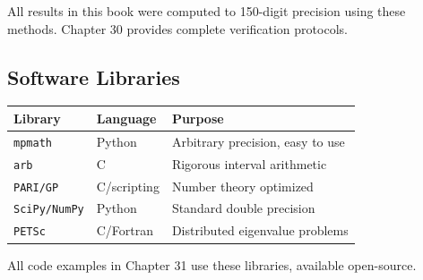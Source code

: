 All results in this book were computed to 150-digit precision using these methods. Chapter 30 provides complete verification protocols.

\subsection{Software Libraries}

\begin{center}
\begin{tabular}{|l|l|l|}
\hline
\textbf{Library} & \textbf{Language} & \textbf{Purpose} \\
\hline
\texttt{mpmath} & Python & Arbitrary precision, easy to use \\
\texttt{arb} & C & Rigorous interval arithmetic \\
\texttt{PARI/GP} & C/scripting & Number theory optimized \\
\texttt{SciPy/NumPy} & Python & Standard double precision \\
\texttt{PETSc} & C/Fortran & Distributed eigenvalue problems \\
\hline
\end{tabular}
\end{center}

All code examples in Chapter 31 use these libraries, available open-source.

